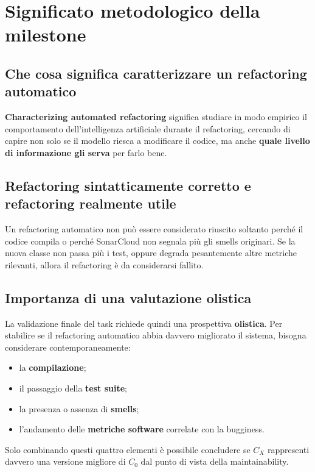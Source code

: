 \section{Significato metodologico della milestone}

\subsection{Che cosa significa caratterizzare un refactoring automatico}

\textbf{Characterizing automated refactoring} significa studiare in modo empirico il comportamento dell'intelligenza artificiale durante il refactoring, cercando di capire non solo se il modello riesca a modificare il codice, ma anche \textbf{quale livello di informazione gli serva} per farlo bene.

\subsection{Refactoring sintatticamente corretto e refactoring realmente utile}

\begin{notaesame}
Un refactoring automatico non può essere considerato riuscito soltanto perché il codice compila o perché SonarCloud non segnala più gli smells originari. Se la nuova classe non passa più i test, oppure degrada pesantemente altre metriche rilevanti, allora il refactoring è da considerarsi fallito.
\end{notaesame}

\subsection{Importanza di una valutazione olistica}

La validazione finale del task richiede quindi una prospettiva \textbf{olistica}. Per stabilire se il refactoring automatico abbia davvero migliorato il sistema, bisogna considerare contemporaneamente:

\begin{itemize}
    \item la \textbf{compilazione};
    \item il passaggio della \textbf{test suite};
    \item la presenza o assenza di \textbf{smells};
    \item l'andamento delle \textbf{metriche software} correlate con la bugginess.
\end{itemize}

Solo combinando questi quattro elementi è possibile concludere se \(C_X\) rappresenti davvero una versione migliore di \(C_0\) dal punto di vista della maintainability.